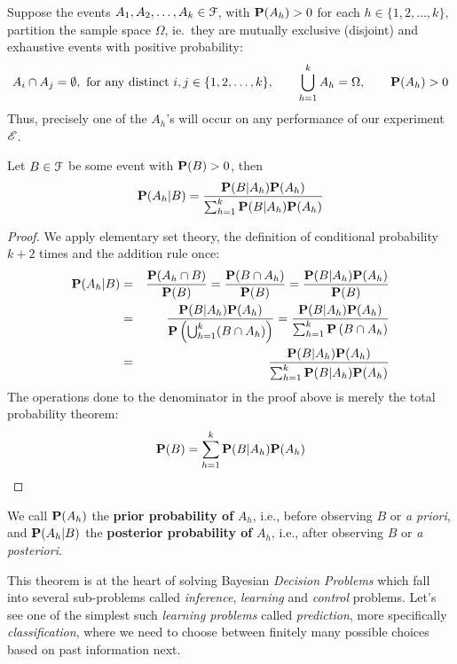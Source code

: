 \begin{framed}
\begin{prop}
 Suppose the events $A_1,A_2,\ldots,A_k \in \mathcal{F}$, with $\mathbf{P}(A_h)>0$ for each $h \in \{1,2,\ldots,k\}$, partition the sample space $\Omega$, ie.~they are mutually exclusive (disjoint) and exhaustive events with positive probability: 
 \[
 A_i \cap A_j = \emptyset, \ \text{for any distinct $i,j \in \{1,2,\ldots,k\}$}, \qquad \bigcup_{h=1}^k A_h = \Omega, \qquad \mathbf{P}(A_h) > 0
 \]
 Thus, precisely one of the $A_h$'s will occur on any performance of our experiment $\mathscr{E}$.  
 
 Let $B \in \mathcal{F}$ be some event with $\mathbf{P}(B) > 0$, then 
 \begin{equation}\label{E:BayesThm}
 \mathbf{P}(A_h|B) = \frac{\mathbf{P}(B|A_h) \mathbf{P}(A_h)}{\sum_{h=1}^k \mathbf{P}(B|A_h) \mathbf{P}(A_h)}
 \end{equation}
 \end{prop}
\end{framed}
 {\scriptsize
 \begin{proof}
 We apply elementary set theory, the definition of conditional probability $k+2$ times and the addition rule once:
 \begin{eqnarray}
 \mathbf{P}(A_h | B) &=& \frac{\mathbf{P}(A_h \cap B)}{\mathbf{P}(B)} = \frac{\mathbf{P}( B \cap A_h)}{\mathbf{P}(B)} = 
 \frac{\mathbf{P}( B | A_h) \mathbf{P}(A_h)}{\mathbf{P}(B)}  \notag \\
 &=& \frac{\mathbf{P}( B | A_h) \mathbf{P}(A_h)}{\mathbf{P} \left( \bigcup_{h=1}^k (B \cap A_h) \right)} =
 \frac{\mathbf{P}( B | A_h) \mathbf{P}(A_h)}{\sum_{h=1}^k \mathbf{P} \left( B \cap A_h \right)} \notag \\
 &=& \frac{\mathbf{P}( B | A_h) \mathbf{P}(A_h)}{\sum_{h=1}^k \mathbf{P}(B | A_h) \mathbf{P}(A_h)} \notag
 \end{eqnarray}
The operations done to the denominator in the proof above is merely the total probability theorem:
\begin{equation*}
\mathbf{P}( B) = \sum_{h=1}^k \mathbf{P}(B | A_h) \mathbf{P}(A_h)
\end{equation*}
 \end{proof}
}

We call $\mathbf{P}(A_h)$ the {\bf prior probability of} $A_h$, i.e., before observing $B$ or \emph{a priori}, and $\mathbf{P}(A_h|B)$ the {\bf posterior probability of} $A_h$, i.e., after observing $B$ or \emph{a posteriori}. 

This theorem is at the heart of solving Bayesian \emph{Decision Problems} which fall into several sub-problems called \emph{inference}, \emph{learning} and \emph{control} problems.
Let's see one of the simplest such \emph{learning problems} called \emph{prediction}, more specifically \emph{classification}, where we need to choose between finitely many possible choices based on past information next.

